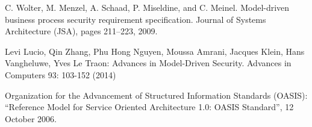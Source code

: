 \documentclass[runningheads,a4paper]{llncs}
\begin{document}
\begin{thebibliography}{4}
C. Wolter, M. Menzel, A. Schaad, P. Miseldine, and C. Meinel. Model-driven business process security requirement specification. Journal of Systems Architecture (JSA), pages 211–223, 2009.

 Levi Lucio, Qin Zhang, Phu Hong Nguyen, Moussa Amrani, Jacques Klein, Hans Vangheluwe, Yves Le Traon: Advances in Model-Driven Security. Advances in Computers 93: 103-152 (2014)

Organization for the Advancement of Structured Information Standards (OASIS): “Reference Model for Service Oriented Architecture 1.0: OASIS Standard”, 12 October 2006.
\end{thebibliography}
\end{document}
